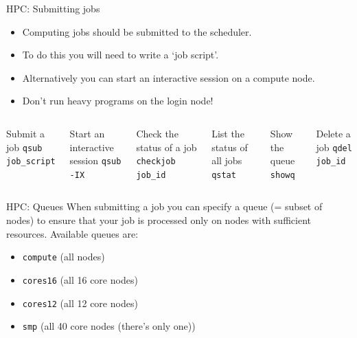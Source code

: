 \documentclass{beamer}
\begin{document}
\begin{frame}{HPC: Submitting jobs}
	\begin{itemize}
		\item Computing jobs should be submitted to the scheduler.
		\item To do this you will need to write a `job script'.
		\item Alternatively you can start an interactive session on a compute node.
		\item Don't run heavy programs on the login node!
	\end{itemize}
    \begin{Examples}
	    \begin{columns}
		\begin{block}{Submit a job}
			\texttt{qsub job\_script}
		\end{block}
		\begin{block}{Start an interactive session}
			\texttt{qsub -IX}
		\end{block}
		\begin{block}{Check the status of a job}
			\texttt{checkjob job\_id}
		\end{block}

		\begin{block}{List the status of all jobs}
			\texttt{qstat}
		\end{block}
		\begin{block}{Show the queue}
			\texttt{showq}
		\end{block}		
		\begin{block}{Delete a job}
			\texttt{qdel job\_id}
		\end{block}
	    \end{columns}		
    \end{Examples}
\end{frame}

\begin{frame}{HPC: Queues}
  When submitting a job you can specify a queue (= subset of nodes) to ensure that your job is processed only on nodes with sufficient resources. Available queues are:
	\begin{itemize}
		\item \texttt{compute} (all nodes)
		\item \texttt{cores16} (all 16 core nodes)
		\item \texttt{cores12} (all 12 core nodes)
		\item \texttt{smp} (all 40 core nodes (there's only one))
	\end{itemize}
\end{frame}
\end{document}
